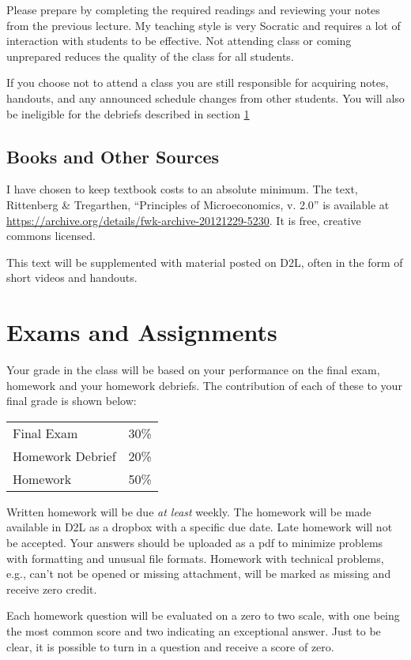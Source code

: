 \documentclass[letterpaper,10pt]{article}
\begin{document}
Please prepare by completing the required readings and reviewing your notes from the
previous lecture. My teaching style is very Socratic and requires a
lot of interaction with students to be effective. Not attending class
or coming unprepared reduces the quality of the class for all
students.

If you choose not to attend a class you are still responsible for
acquiring notes, handouts, and any announced schedule changes from
other students. You will also be ineligible for the debriefs described in section \ref{Grades}

\subsection{Books and Other Sources}
I have chosen to keep textbook costs to an absolute minimum.  The text, Rittenberg \& Tregarthen, ``Principles of Microeconomics, v. 2.0'' is available at \url{https://archive.org/details/fwk-archive-20121229-5230}.  It is free, creative commons licensed.  

This text will be supplemented with material posted on D2L, often in the form of short videos and handouts.

\section{Exams and Assignments}\label{Grades}

Your grade in the class will be based on your performance on the final
exam, homework and your homework debriefs. The contribution of each of these to your final grade is shown below:

\begin{tabular}{ll}
  Final Exam&30\%\\
  Homework Debrief&20\%\\
  Homework&50\%\\
\end{tabular} 

Written homework will be due \emph{at least} weekly.  The homework will be made available in D2L as a dropbox with a specific due date.  
Late homework will not be accepted.  Your answers should be uploaded as a pdf to minimize problems with formatting and unusual file formats. Homework with technical problems, e.g., can't not be opened or missing attachment, will be marked as missing and receive zero credit.

Each homework question will be evaluated on a zero to two scale, with one being the most common score and two indicating an exceptional answer.  Just to be clear, it is possible to turn in a question and receive a score of zero.
\end{document}
